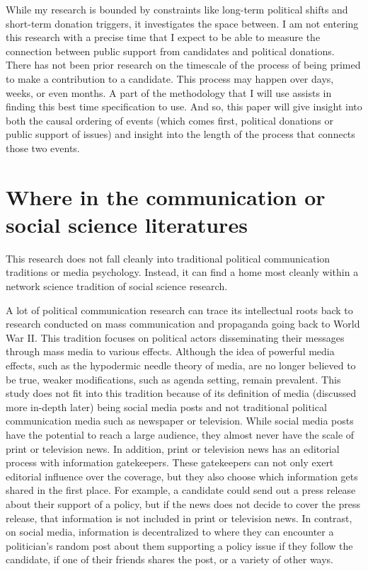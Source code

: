 \documentclass[12pt,]{article}
\begin{document}
While my research is bounded by constraints like long-term political
shifts and short-term donation triggers, it investigates the space
between. I am not entering this research with a precise time that I
expect to be able to measure the connection between public support from
candidates and political donations. There has not been prior research on
the timescale of the process of being primed to make a contribution to a
candidate. This process may happen over days, weeks, or even months. A
part of the methodology that I will use assists in finding this best
time specification to use. And so, this paper will give insight into
both the causal ordering of events (which comes first, political
donations or public support of issues) and insight into the length of
the process that connects those two events.

\hypertarget{where-in-the-communication-or-social-science-literatures}{%
\section{Where in the communication or social science
literatures}\label{where-in-the-communication-or-social-science-literatures}}

This research does not fall cleanly into traditional political
communication traditions or media psychology. Instead, it can find a
home most cleanly within a network science tradition of social science
research.

A lot of political communication research can trace its intellectual
roots back to research conducted on mass communication and propaganda
going back to World War II. This tradition focuses on political actors
disseminating their messages through mass media to various effects.
Although the idea of powerful media effects, such as the hypodermic
needle theory of media, are no longer believed to be true, weaker
modifications, such as agenda setting, remain prevalent. This study does
not fit into this tradition because of its definition of media
(discussed more in-depth later) being social media posts and not
traditional political communication media such as newspaper or
television. While social media posts have the potential to reach a large
audience, they almost never have the scale of print or television news.
In addition, print or television news has an editorial process with
information gatekeepers. These gatekeepers can not only exert editorial
influence over the coverage, but they also choose which information gets
shared in the first place. For example, a candidate could send out a
press release about their support of a policy, but if the news does not
decide to cover the press release, that information is not included in
print or television news. In contrast, on social media, information is
decentralized to where they can encounter a politician's random post
about them supporting a policy issue if they follow the candidate, if
one of their friends shares the post, or a variety of other ways.
\end{document}
